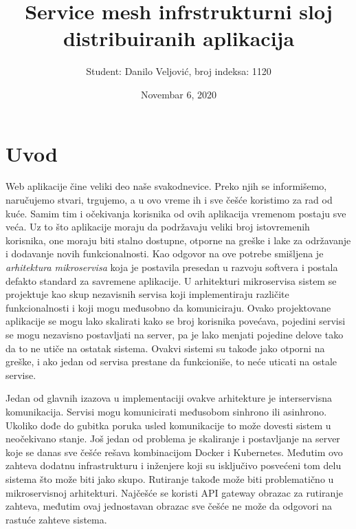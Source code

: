 \documentclass[a4paper,12pt]{report}
\begin{document}

\title{\Large{\textbf{Service mesh infrstrukturni sloj distribuiranih aplikacija }}}
\author{Student: Danilo Veljović, broj indeksa: 1120}
\date{Novembar 6, 2020}
\maketitle
\let\cleardoublepage\clearpage
\tableofcontents


\setcounter{page}{1}

\chapter{Uvod}

Web aplikacije čine veliki deo naše svakodnevice. Preko njih se informišemo, naručujemo stvari, trgujemo, a u ovo vreme ih i sve češće koristimo za rad od kuće. Samim tim i očekivanja korisnika od ovih aplikacija vremenom postaju sve veća. Uz to što aplikacije moraju da podržavaju veliki broj istovremenih korisnika, one moraju biti stalno dostupne, otporne na greške i lake za održavanje i dodavanje novih funkcionalnosti. Kao odgovor na ove potrebe smišljena je \textit{arhitektura mikroservisa} koja je postavila presedan u razvoju softvera i postala defakto standard za savremene aplikacije. U arhitekturi mikroservisa sistem se projektuje kao skup nezavisnih servisa koji implementiraju različite funkcionalnosti i koji mogu međusobno da komuniciraju.  Ovako projektovane aplikacije se mogu lako skalirati kako se broj korisnika povećava, pojedini servisi se mogu nezavisno postavljati na server, pa je lako menjati pojedine delove tako da to ne utiče na ostatak sistema. Ovakvi sistemi su takođe jako otporni na greške, i ako jedan od servisa prestane da funkcioniše, to neće uticati na ostale servise.  \newline

Jedan od glavnih izazova u implementaciji ovakve arhitekture je interservisna komunikacija. Servisi mogu komunicirati međusobom sinhrono ili asinhrono. Ukoliko dođe do gubitka poruka usled komunikacije to može dovesti sistem u neočekivano stanje. Još jedan od problema je skaliranje i postavljanje na server koje se danas sve češće rešava kombinacijom Docker i Kubernetes. Međutim ovo zahteva dodatnu infrastrukturu i inženjere koji su isključivo posvećeni tom delu sistema što može biti jako skupo. Rutiranje takođe može biti problematično u mikroservisnoj arhitekturi. Najčešće se koristi API gateway obrazac za rutiranje zahteva, međutim ovaj jednostavan obrazac sve češće ne može da odgovori na rastuće zahteve sistema. \newline
\end{document}
